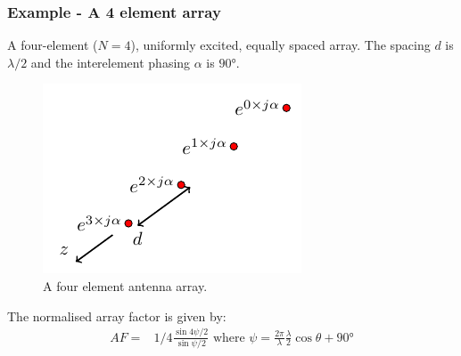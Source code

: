 \documentclass[10pt]{beamer}
\begin{document}
\begin{frame}
    \frametitle{Example - A 4 element array}
A four-element ($N =4$), uniformly excited, equally spaced array. The spacing $d$ is $\lambda/2$ and the interelement phasing $\alpha$ is $\ang{90}$.

\begin{figure}[h!]
    \centering
    \includegraphics[width=.3\textwidth]{4_elements.pdf}
    \caption{A four element antenna array.}
    \label{<label>}
\end{figure}
    The normalised array factor is given by:
    \begin{align*}
        AF {}=& 1/4\frac{\sin 4 \psi/2 }{\sin \psi/2 } \text { where } \psi =\frac{2 \pi}{\lambda} \frac{\lambda }{2} \cos \theta + \ang{90}
    \end{align*}

\end{frame}
\end{document}
